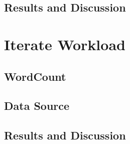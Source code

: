 \subsection{Results and Discussion}

\section{Iterate Workload}
\subsection{WordCount}
\subsection{Data Source}
\subsection{Results and Discussion}

\clearpage